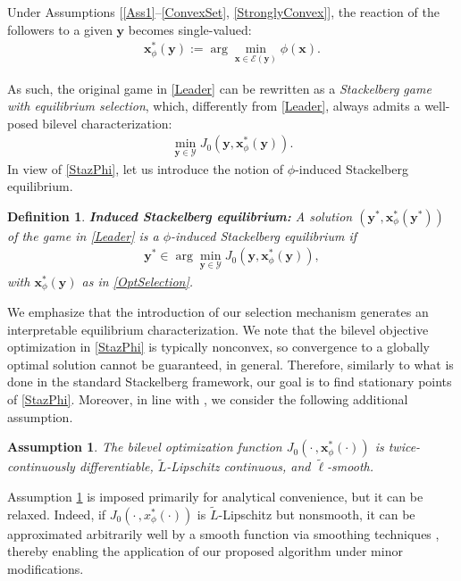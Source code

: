 \documentclass[letterpaper, 10 pt, conference]{ieeeconf}
\newcommand\xbf{\mathbf{x}}
\newcommand\ybf{\mathbf{y}}
\newtheorem{definition}{Definition}
\newtheorem{assumption}{Assumption}
\begin{document}
Under Assumptions [\ref{Ass1}--\ref{ConvexSet}, \ref{StronglyConvex}], the reaction of the followers to a given $\ybf$ becomes single-valued:
\begin{align}\label{OptSelection}
    \xbf^*_\phi(\ybf):=\arg \min \limits_{ \xbf \in \mathcal{E}(\ybf)} \phi(\xbf).
\end{align}

As such, the original game in \eqref{Leader} can be rewritten as a \emph{Stackelberg game with equilibrium selection},
which, differently from \eqref{Leader}, always admits a well-posed bilevel characterization:
\begin{align}\label{StazPhi}
        \min \limits_{\ybf\in \mathcal{Y}} J_0(\ybf, \xbf^*_\phi(\ybf)).
    \end{align}
In view of \eqref{StazPhi}, let us introduce the notion of $\phi$-induced Stackelberg equilibrium.
\begin{definition}{\textbf{Induced Stackelberg equilibrium:}}
    A solution $\left(\ybf^*, \xbf^*_\phi(\ybf^*)\right)$ of the game in \eqref{Leader} is a $\phi$-induced Stackelberg equilibrium if
    \begin{align}
        \ybf^* \in \arg\min \limits_{\ybf \in \mathcal{Y}} J_0(\ybf, \xbf^*_\phi(\ybf)),
    \end{align}
    with $\xbf^*_\phi(\ybf)$ as in \eqref{OptSelection}.
\end{definition}
We emphasize that the introduction of our selection mechanism generates an interpretable equilibrium characterization. 
We note that the bilevel objective optimization in \eqref{StazPhi} is typically nonconvex, so convergence to a globally optimal solution cannot be guaranteed, in general. Therefore,  similarly to what is done in the standard Stackelberg framework, our goal is to find stationary points of \eqref{StazPhi}.
Moreover, in line with \cite{maheshwari2024follower}, we consider the following additional assumption.
\begin{assumption}\label{AssStrong}
    The bilevel optimization function $J_0(\cdot\,, \xbf^*_\phi(\cdot))$ is twice-continuously differentiable, $\tilde{L}$-Lipschitz continuous, and $\tilde{\ell}$-smooth.
\end{assumption}
Assumption \ref{AssStrong} is imposed primarily for analytical convenience, but it can be relaxed. Indeed, if $J_0(\cdot\,, x^*_\phi(\cdot))$ is $\tilde{L}$-Lipschitz but nonsmooth, it can be approximated arbitrarily well by a smooth function via smoothing techniques \cite{nesterov2005smooth}, thereby enabling the application of our proposed algorithm under minor modifications.
\end{document}
